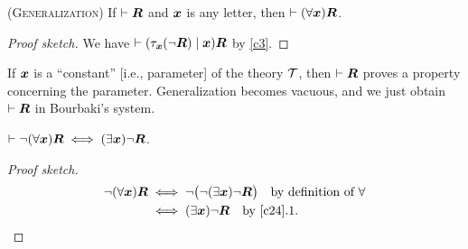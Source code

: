 \begin{dc}\label{c27}\textup{(\textsc{Generalization})}\enspace\ignorespaces%
If $\vdash\boldsymbol{R}$ and $\boldsymbol{x}$ is any letter, then
$\vdash(\forall\boldsymbol{x})\boldsymbol{R}$.
\end{dc}

\begin{proof}[Proof sketch]
We have $\vdash(\tau_{\boldsymbol{x}}(\neg\boldsymbol{R})\mid\boldsymbol{x})\boldsymbol{R}$
by \ref{c3}.
\end{proof}

\begin{remark*}
If $\boldsymbol{x}$ is a ``constant'' [i.e., parameter] of the theory
$\mathcal{T}$, then $\vdash\boldsymbol{R}$ proves a property concerning
the parameter. Generalization becomes vacuous, and we just obtain
$\vdash\boldsymbol{R}$ in Bourbaki's system.
\end{remark*}

\begin{dc}\label{c28}%
$\vdash\neg(\forall\boldsymbol{x})\boldsymbol{R}\iff(\exists\boldsymbol{x})\neg\boldsymbol{R}$.
\end{dc}

\begin{proof}[Proof sketch]
\begin{align*}
\neg(\forall\boldsymbol{x})\boldsymbol{R} &\iff\neg\bigl(\neg(\exists\boldsymbol{x})\neg\boldsymbol{R}\bigr)\quad\mbox{by definition of $\forall$}\\
&\iff(\exists\boldsymbol{x})\neg\boldsymbol{R}\quad\mbox{by \ref{c24}.1}.\qedhere
\end{align*}
\end{proof}
